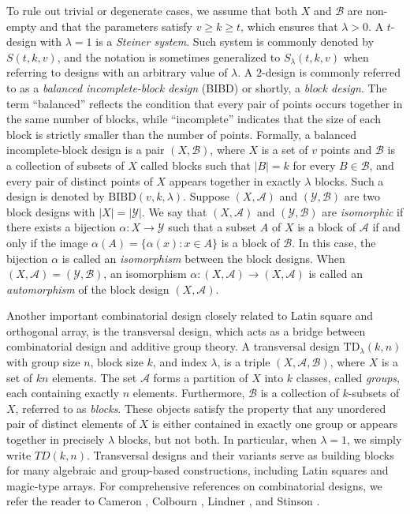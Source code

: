 \documentclass[preprint,11pt]{elsarticle}
\begin{document}
To rule out trivial or degenerate cases, we assume that both $X$ and 
$\mathcal{B}$ are non-empty and that the parameters satisfy $v \ge k \ge t$, 
which ensures that $\lambda > 0$. A $t$-design with $\lambda = 1$ is  
a \emph{Steiner system}. Such system is commonly denoted by $S(t,k,v)$, and 
the notation is sometimes generalized to $S_{\lambda}(t,k,v)$ when referring 
to designs with an arbitrary value of $\lambda$. A $2$-design is commonly referred to as a \emph{balanced incomplete-block design} (BIBD) or shortly, a \emph{block design}. 
The term ``balanced'' reflects the condition that every pair of points 
occurs together in the same number of blocks, while ``incomplete'' indicates 
that the size of each block is strictly smaller than the number of points. Formally, a balanced incomplete-block design is a pair 
$(X,\mathcal{B})$, where $X$ is a set of $v$ points and 
$\mathcal{B}$ is a collection of subsets of $X$ called blocks such 
that $|B|=k$ for every $B\in\mathcal{B}$, and every pair of distinct points 
of $X$ appears together in exactly $\lambda$ blocks. 
Such a design is denoted by $\mathrm{BIBD}(v,k,\lambda)$. 
Suppose $(X,\mathcal{A})$ and $(\mathcal{Y},\mathcal{B})$ are two block designs with $|X|=|\mathcal{Y}|$. We say that $(X,\mathcal{A})$ and $(\mathcal{Y},\mathcal{B})$ are \emph{isomorphic} if there exists a bijection $\alpha:X\to\mathcal{Y}$ such that a subset $A$ of $X$ is a block of $\mathcal{A}$ if and only if the image $\alpha(A)=\{\alpha(x):x\in A\}$ is a block of $\mathcal{B}$. In this case, the bijection $\alpha$ is called an \emph{isomorphism} between the block designs. When $(X,\mathcal{A})=(\mathcal{Y},\mathcal{B})$, an isomorphism $\alpha:(X,\mathcal{A})\to(X,\mathcal{A})$ is called an \emph{automorphism} of the block design $(X,\mathcal{A})$.


Another important combinatorial design closely related to Latin square and orthogonal array, is the {transversal design}\cite{MR1370815}, which acts as a bridge between combinatorial design and additive group theory. A transversal design $\mathrm{TD}_{\lambda}(k,n)$ with group size $n$, block size $k$, and index $\lambda$, is a triple $(X,\mathcal{A},\mathcal{B})$,
where $X$ is a set of $kn$ elements. The set $\mathcal{A}$ forms a partition of $X$
into $k$ classes, called \emph{groups}, each containing exactly $n$ elements.
Furthermore, $\mathcal{B}$ is a collection of $k$-subsets of $X$, referred to as
\emph{blocks}. These objects satisfy the property that any unordered pair of
distinct elements of $X$ is either contained in exactly one group or appears
together in precisely $\lambda$ blocks, but not both. In particular, when $\lambda = 1$, we simply write $TD(k, n)$. 
Transversal designs and their variants serve as building blocks for many algebraic and group-based constructions, including Latin squares and magic-type arrays. 
For comprehensive references on combinatorial designs, we refer the reader to Cameron \cite{zbMATH00050655}, Colbourn \cite{MR1370815, MR1435524},  Lindner \cite{MR2469212}, and Stinson \cite{MR2029249}.
\end{document}
